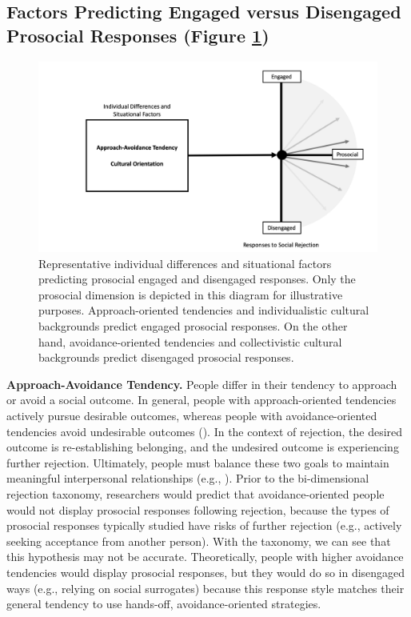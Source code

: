\documentclass[
]{udthesis}
\begin{document}
\subsection{Factors Predicting Engaged versus Disengaged Prosocial Responses (Figure \ref{fig:bidr-prosocial})}\label{factors-predicting-engaged-versus-disengaged-prosocial-responses-figure-reffigbidr-prosocial}

\begin{figure}
\includegraphics[width=1\linewidth]{images/bidr-prosocial} \caption{Representative individual differences and situational factors predicting prosocial engaged and disengaged responses. Only the prosocial dimension is depicted in this diagram for illustrative purposes. Approach-oriented tendencies and individualistic cultural backgrounds predict engaged prosocial responses. On the other hand, avoidance-oriented tendencies and collectivistic cultural backgrounds predict disengaged prosocial responses.}\label{fig:bidr-prosocial}
\end{figure}

\textbf{Approach-Avoidance Tendency.} People differ in their tendency to
approach or avoid a social outcome. In general, people with
approach-oriented tendencies actively pursue desirable outcomes, whereas
people with avoidance-oriented tendencies avoid undesirable outcomes
(). In the context of rejection,
the desired outcome is re-establishing belonging, and the undesired
outcome is experiencing further rejection. Ultimately, people must
balance these two goals to maintain meaningful interpersonal
relationships (e.g., ). Prior to the
bi-dimensional rejection taxonomy, researchers would predict that
avoidance-oriented people would not display prosocial responses
following rejection, because the types of prosocial responses typically
studied have risks of further rejection (e.g., actively seeking
acceptance from another person). With the taxonomy, we can see that this
hypothesis may not be accurate. Theoretically, people with higher
avoidance tendencies would display prosocial responses, but they would
do so in disengaged ways (e.g., relying on social surrogates) because
this response style matches their general tendency to use hands-off,
avoidance-oriented strategies.
\end{document}
